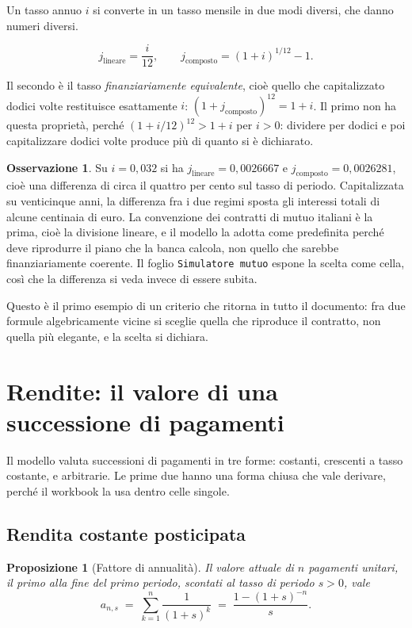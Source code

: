\documentclass[11pt,a4paper]{article}
\theoremstyle{definition}
\newtheorem{osservazione}[definizione]{Osservazione}
\theoremstyle{plain}
\newtheorem{proposizione}[definizione]{Proposizione}
\begin{document}
Un tasso annuo $i$ si converte in un tasso mensile in due modi diversi, che danno numeri diversi.

\begin{equation}
j_{\text{lineare}} = \frac{i}{12}, \qquad
j_{\text{composto}} = (1+i)^{1/12} - 1 .
\label{eq:conversione}
\end{equation}

Il secondo è il tasso \emph{finanziariamente equivalente}, cioè quello che capitalizzato dodici volte restituisce esattamente $i$: $(1+j_{\text{composto}})^{12} = 1+i$. Il primo non ha questa proprietà, perché $(1+i/12)^{12} > 1+i$ per $i>0$: dividere per dodici e poi capitalizzare dodici volte produce più di quanto si è dichiarato.

\begin{osservazione}
Su $i = 0{,}032$ si ha $j_{\text{lineare}} = 0{,}0026667$ e $j_{\text{composto}} = 0{,}0026281$, cioè una differenza di circa il quattro per cento sul tasso di periodo. Capitalizzata su venticinque anni, la differenza fra i due regimi sposta gli interessi totali di alcune centinaia di euro. La convenzione dei contratti di mutuo italiani è la prima, cioè la divisione lineare, e il modello la adotta come predefinita perché deve riprodurre il piano che la banca calcola, non quello che sarebbe finanziariamente coerente. Il foglio \texttt{Simulatore mutuo} espone la scelta come cella, così che la differenza si veda invece di essere subita.
\end{osservazione}

Questo è il primo esempio di un criterio che ritorna in tutto il documento: fra due formule algebricamente vicine si sceglie quella che riproduce il contratto, non quella più elegante, e la scelta si dichiara.

\section{Rendite: il valore di una successione di pagamenti}

Il modello valuta successioni di pagamenti in tre forme: costanti, crescenti a tasso costante, e arbitrarie. Le prime due hanno una forma chiusa che vale derivare, perché il workbook la usa dentro celle singole.

\subsection{Rendita costante posticipata}

\begin{proposizione}[Fattore di annualità]
Il valore attuale di $n$ pagamenti unitari, il primo alla fine del primo periodo, scontati al tasso di periodo $s>0$, vale
\begin{equation}
a_{n,s} \;=\; \sum_{k=1}^{n} \frac{1}{(1+s)^k} \;=\; \frac{1-(1+s)^{-n}}{s} .
\label{eq:annualita}
\end{equation}
\end{proposizione}
\end{document}
